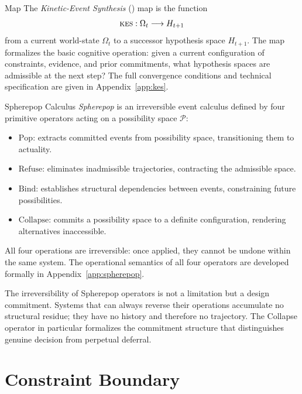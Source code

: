 \begin{definition}{\KES Map}
The \emph{Kinetic-Event Synthesis} (\KES) map is the function
\[
  \textsc{kes}: \Omega_t \longrightarrow H_{t+1}
\]
from a current world-state $\Omega_t$ to a successor hypothesis space $H_{t+1}$.
The map formalizes the basic cognitive operation: given a current configuration of
constraints, evidence, and prior commitments, what hypothesis spaces are admissible
at the next step? The full convergence conditions and technical specification are
given in Appendix~\ref{app:kes}.
\end{definition}

\begin{definition}{Spherepop Calculus}
\emph{Spherepop} is an irreversible event calculus defined by four primitive
operators acting on a possibility space $\mathcal{P}$:
\begin{itemize}
  \item $\mathrm{Pop}$: extracts committed events from possibility space,
        transitioning them to actuality.
  \item $\mathrm{Refuse}$: eliminates inadmissible trajectories, contracting the
        admissible space.
  \item $\mathrm{Bind}$: establishes structural dependencies between events,
        constraining future possibilities.
  \item $\mathrm{Collapse}$: commits a possibility space to a definite
        configuration, rendering alternatives inaccessible.
\end{itemize}
All four operations are irreversible: once applied, they cannot be undone within
the same system. The operational semantics of all four operators are developed
formally in Appendix~\ref{app:spherepop}.
\end{definition}

\begin{remark}
The irreversibility of Spherepop operators is not a limitation but a design
commitment. Systems that can always reverse their operations accumulate no
structural residue; they have no history and therefore no trajectory. The
Collapse operator in particular formalizes the commitment structure that
distinguishes genuine decision from perpetual deferral.
\end{remark}

\section*{Constraint Boundary}

